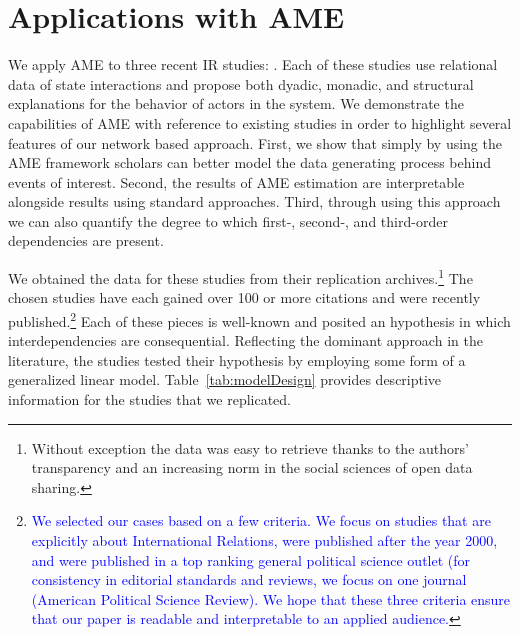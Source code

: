 \section{\textbf{Applications with AME}}

We apply AME to three recent IR studies: \citet{reiter:stam:2003, weeks:2012, gibler:2017}. Each of these studies use relational data of state interactions and propose both dyadic, monadic, and structural explanations for the behavior of actors in the system. We demonstrate the capabilities of AME with reference to existing studies in order to highlight several features of our network based approach. First, we show that simply by using the AME framework scholars can better model the data generating process behind events of interest. Second, the results of AME estimation are interpretable alongside results using standard approaches. Third, through using this approach we can also quantify the degree to which first-, second-, and third-order dependencies are present.

We obtained the data for these studies from their replication archives.\footnote{Without exception the data was easy to retrieve thanks to the authors' transparency and an increasing norm in the social sciences of open data sharing.} The chosen studies have each gained over 100 or more citations and were recently published.\footnote{\textcolor{blue}{We selected our cases based on a few criteria. We focus on studies that are explicitly about International Relations, were published after the year 2000, and were published in a top ranking general political science outlet (for consistency in editorial standards and reviews, we focus on one journal (American Political Science Review). We hope that these three criteria ensure that our paper is readable and interpretable to an applied audience.}} Each of these pieces is well-known and posited an hypothesis in which interdependencies are consequential. Reflecting the dominant approach in the literature, the studies tested their hypothesis by employing some form of a generalized linear model. Table~\ref{tab:modelDesign} provides descriptive information for the studies that we replicated.

